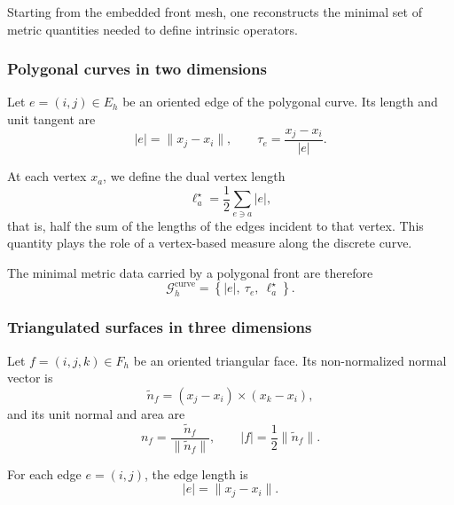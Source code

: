 \documentclass{article}
\begin{document}
Starting from the embedded front mesh, one reconstructs the minimal set of
metric quantities needed to define intrinsic operators.

\subsubsection{Polygonal curves in two dimensions}

Let $e=(i,j)\in E_h$ be an oriented edge of the polygonal curve.
Its length and unit tangent are
\begin{equation}
|e| = \|x_j-x_i\|,
\qquad
\tau_e = \frac{x_j-x_i}{|e|}.
\label{eq:curve_edge_data}
\end{equation}

At each vertex $x_a$, we define the dual vertex length
\begin{equation}
\ell_a^\star
=
\frac12 \sum_{e\ni a} |e|,
\label{eq:curve_dual_length}
\end{equation}
that is, half the sum of the lengths of the edges incident to that vertex.
This quantity plays the role of a vertex-based measure along the discrete curve.

The minimal metric data carried by a polygonal front are therefore
\begin{equation}
\mathcal{G}_h^{\mathrm{curve}}
=
\left\{
|e|,\ \tau_e,\ \ell_a^\star
\right\}.
\label{eq:curve_metric_tuple}
\end{equation}

\subsubsection{Triangulated surfaces in three dimensions}

Let $f=(i,j,k)\in F_h$ be an oriented triangular face.
Its non-normalized normal vector is
\begin{equation}
\widetilde{n}_f = (x_j-x_i)\times(x_k-x_i),
\label{eq:unnormalized_face_normal}
\end{equation}
and its unit normal and area are
\begin{equation}
n_f = \frac{\widetilde{n}_f}{\|\widetilde{n}_f\|},
\qquad
|f| = \frac12 \|\widetilde{n}_f\|.
\label{eq:face_area_normal}
\end{equation}

For each edge $e=(i,j)$, the edge length is
\begin{equation}
|e| = \|x_j-x_i\|.
\label{eq:surface_edge_length}
\end{equation}
\end{document}
